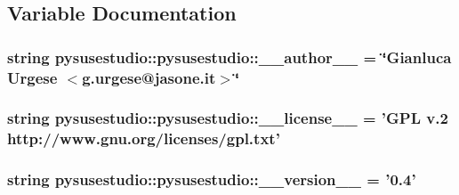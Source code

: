 \subsection{Variable Documentation}
\hypertarget{namespacepysusestudio_1_1pysusestudio_aacbb9fe95948329159fcede525a76a07}{
\subsubsection[{\_\-\_\-author\_\-\_\-}]{\setlength{\rightskip}{0pt plus 5cm}string {\bf pysusestudio::pysusestudio::\_\-\_\-author\_\-\_\-} = \char`\"{}Gianluca Urgese $<$g.urgese@jasone.it$>$\char`\"{}}}
\label{namespacepysusestudio_1_1pysusestudio_aacbb9fe95948329159fcede525a76a07}
\hypertarget{namespacepysusestudio_1_1pysusestudio_abe9d0e42445b13ae1596ad298d620219}{
\subsubsection[{\_\-\_\-license\_\-\_\-}]{\setlength{\rightskip}{0pt plus 5cm}string {\bf pysusestudio::pysusestudio::\_\-\_\-license\_\-\_\-} = 'GPL v.2 http://www.gnu.org/licenses/gpl.txt'}}
\label{namespacepysusestudio_1_1pysusestudio_abe9d0e42445b13ae1596ad298d620219}
\hypertarget{namespacepysusestudio_1_1pysusestudio_ab165d16997c47cc84bce008ef12ed6b7}{
\subsubsection[{\_\-\_\-version\_\-\_\-}]{\setlength{\rightskip}{0pt plus 5cm}string {\bf pysusestudio::pysusestudio::\_\-\_\-version\_\-\_\-} = '0.4'}}
\label{namespacepysusestudio_1_1pysusestudio_ab165d16997c47cc84bce008ef12ed6b7}
